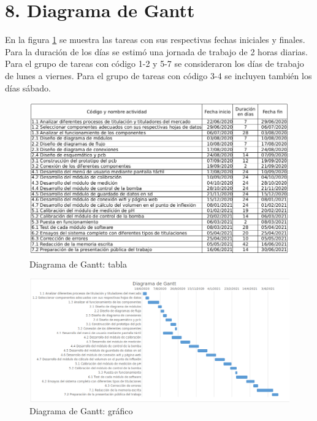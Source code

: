 \documentclass[11pt]{charter}
\begin{document}
\section{8. Diagrama de Gantt}
\label{sec:gantt}

En la figura \ref{fig:tablaGantt} se muestra las tareas con sus respectivas fechas iniciales y finales. Para la duración de los días se estimó una jornada de trabajo de 2 horas diarias. Para el grupo de tareas con código 1-2 y 5-7 se consideraron los días  de trabajo de lunes a viernes. Para el grupo de tareas con código 3-4 se incluyen también los días sábado. 

\begin{figure}[htpb]
\centering 
\includegraphics[width=1\textwidth]{./Figuras/TablaGantt.png}
\caption{Diagrama de Gantt: tabla}
\label{fig:tablaGantt}
\end{figure}

\begin{landscape}
\begin{figure}[p]
\centering 
\includegraphics[width=1.5\textwidth]{./Figuras/DiagramaGantt.png}
\caption{Diagrama de Gantt: gráfico}
\label{fig:diagramaGantt}
\end{figure}
\end{landscape}
\end{document}
